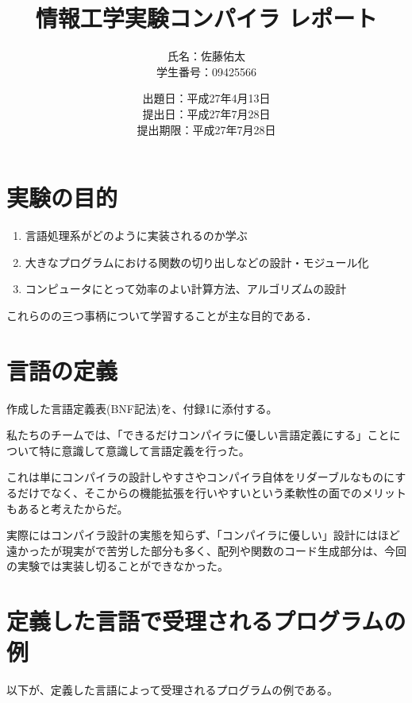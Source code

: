 \documentclass[11pt,a4j]{jarticle}
\title{情報工学実験コンパイラ レポート}
\author{氏名：佐藤佑太\\学生番号：09425566}
\date{出題日：平成27年4月13日\\提出日：平成27年7月28日\\提出期限：平成27年7月28日}
\begin{document}
\maketitle
\newpage



\section{実験の目的}

\begin{enumerate}
\item {言語処理系がどのように実装されるのか学ぶ}
\item {大きなプログラムにおける関数の切り出しなどの設計・モジュール化}
\item {コンピュータにとって効率のよい計算方法、アルゴリズムの設計}
\end{enumerate}
これらのの三つ事柄について学習することが主な目的である．




\section{言語の定義}

作成した言語定義表(BNF記法)を、付録1に添付する。

私たちのチームでは、「できるだけコンパイラに優しい言語定義にする」ことについて特に意識して意識して言語定義を行った。

これは単にコンパイラの設計しやすさやコンパイラ自体をリダーブルなものにするだけでなく、そこからの機能拡張を行いやすいという柔軟性の面でのメリットもあると考えたからだ。

実際にはコンパイラ設計の実態を知らず、「コンパイラに優しい」設計にはほど遠かったが現実がで苦労した部分も多く、配列や関数のコード生成部分は、今回の実験では実装し切ることができなかった。




\section{定義した言語で受理されるプログラムの例}


以下が、定義した言語によって受理されるプログラムの例である。


\end{document}
